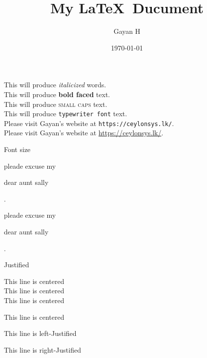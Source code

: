 \documentclass[11pt]{article}
\title{My \LaTeX\ Ducument}
\author{Gayan H}
\date{\today}
\begin{document}
\tableofcontents
\maketitle

This will produce \textit{italicized} words.\\
This will produce \textbf{bold faced} text.\\
This will produce \textsc{small caps} text.\\
This will produce \texttt{typewriter font} text.\\
Please visit Gayan's website at \texttt{https://ceylonsys.lk/}.\\
Please visit Gayan's website at \url{https://ceylonsys.lk/}.\\

\vspace{1cm}

Font size

pleade excuse my \begin{large}dear aunt sally\end{large}.

pleade excuse my \begin{Large}dear aunt sally\end{Large}.

\vspace{1cm}

Justified

\centering
This line is centered\\
This line is centered\\
This line is centered

\begin{center}This line is centered\end{center}
\begin{flushleft}This line is left-Justified\end{flushleft}
\begin{flushright}This line is right-Justified\end{flushright}
\end{document}
